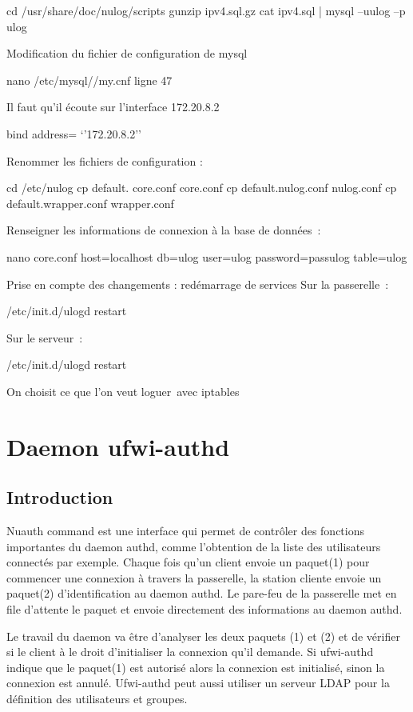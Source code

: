 \documentclass[12pt]{report}
\begin{document}
cd /usr/share/doc/nulog/scripts
gunzip ipv4.sql.gz
cat ipv4.sql | mysql –uulog –p ulog

Modification du fichier de configuration de mysql

nano /etc/mysql//my.cnf
ligne 47

Il faut qu’il écoute sur l’interface 172.20.8.2

bind address= ‘’172.20.8.2’’

Renommer les fichiers de configuration :

cd /etc/nulog
cp default. core.conf core.conf
cp default.nulog.conf nulog.conf
cp default.wrapper.conf wrapper.conf

Renseigner les informations de connexion à la base de données :

nano core.conf
host=localhost
db=ulog
user=ulog
password=passulog
table=ulog

Prise en compte des changements : redémarrage de services
Sur la passerelle :

/etc/init.d/ulogd restart

Sur le serveur :

/etc/init.d/ulogd restart


On choisit ce que l’on veut loguer avec iptables

\chapter{Daemon ufwi-authd}
\section{Introduction}

Nuauth command est une interface qui permet de contrôler des fonctions importantes du daemon authd, 
comme l'obtention de la liste des utilisateurs connectés par exemple.
Chaque fois qu'un client envoie un paquet(1) pour commencer une connexion à travers la 
passerelle, la station cliente envoie un paquet(2) d'identification au daemon authd. Le 
pare-feu de la passerelle met en file d'attente le paquet et envoie directement des 
informations au daemon authd.

Le travail du daemon va être d'analyser les deux paquets (1) et (2) et de vérifier si 
le client à le droit d'initialiser la connexion qu'il demande.
Si ufwi-authd indique que le paquet(1) est autorisé alors la connexion est initialisé,
sinon la connexion est annulé. Ufwi-authd peut aussi utiliser un serveur LDAP pour la
définition des utilisateurs et groupes.
\end{document}
